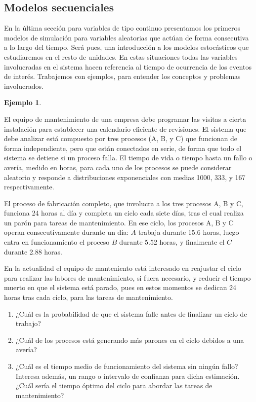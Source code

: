 \documentclass[
]{book}
\providecommand{\tightlist}{%
  \setlength{\itemsep}{0pt}\setlength{\parskip}{0pt}}
\theoremstyle{definition}
\theoremstyle{definition}
\newtheorem{example}{Ejemplo}[chapter]
\theoremstyle{definition}
\theoremstyle{definition}
\theoremstyle{remark}
\begin{document}
\hypertarget{modelos-secuenciales}{%
\subsection{Modelos secuenciales}\label{modelos-secuenciales}}

En la última sección para variables de tipo continuo presentamos los primeros modelos de simulación para variables aleatorias que actúan de forma consecutiva a lo largo del tiempo. Será pues, una introducción a los modelos estocásticos que estudiaremos en el resto de unidades. En estas situaciones todas las variables involucradas en el sistema hacen referencia al tiempo de ocurrencia de los eventos de interés. Trabajemos con ejemplos, para entender los conceptos y problemas involucrados.

\begin{example}
\protect\hypertarget{exm:secuencia1}{}\label{exm:secuencia1}

El equipo de mantenimiento de una empresa debe programar las visitas a cierta instalación para establecer una calendario eficiente de revisiones. El sistema que debe analizar está compuesto por tres procesos (A, B, y C) que funcionan de forma independiente, pero que están conectados en serie, de forma que todo el sistema se detiene si un proceso falla. El tiempo de vida o tiempo hasta un fallo o avería, medido en horas, para cada uno de los procesos se puede considerar aleatorio y responde a distribuciones exponenciales con medias 1000, 333, y 167 respectivamente.

El proceso de fabricación completo, que involucra a los tres procesos A, B y C, funciona 24 horas al día y completa un ciclo cada siete días, tras el cual realiza un parón para tareas de mantenimiento. En ese ciclo, los procesos A, B y C operan consecutivamente durante un día: \(A\) trabaja durante 15.6 horas, luego entra en funcionamiento el proceso \(B\) durante 5.52 horas, y finalmente el \(C\) durante 2.88 horas.

En la actualidad el equipo de manteniento está interesado en reajustar el ciclo para realizar las labores de mantenimiento, si fuera necesario, y reducir el tiempo muerto en que el sistema está parado, pues en estos momentos se dedican 24 horas tras cada ciclo, para las tareas de mantenimiento.

\begin{enumerate}
\def\labelenumi{\arabic{enumi}.}
\tightlist
\item
  ¿Cuál es la probabilidad de que el sistema falle antes de finalizar un ciclo de trabajo?
\item
  ¿Cuál de los procesos está generando más parones en el ciclo debidos a una avería?
\item
  ¿Cuál es el tiempo medio de funcionamiento del sistema sin ningún fallo? Interesa además, un rango o intervalo de confianza para dicha estimación. ¿Cuál sería el tiempo óptimo del ciclo para abordar las tareas de mantenimiento?
\end{enumerate}

\end{example}
\end{document}
